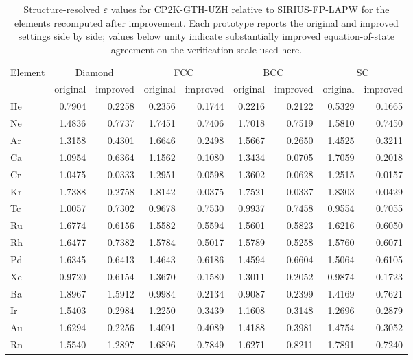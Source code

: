\documentclass[aps,prb,reprint,amsmath,amssymb,superscriptaddress,longbibliography,floatfix]{revtex4-2}
\begin{document}
\begin{table}[htbp]
\centering
\caption{Structure-resolved $\varepsilon$ values for CP2K-GTH-UZH relative to SIRIUS-FP-LAPW for the elements recomputed after improvement. Each prototype reports the original and improved settings side by side; values below unity indicate substantially improved equation-of-state agreement on the verification scale used here.}
\label{tab:epsilon-cp2k-uzh-merged-vs-sirius-fp-lapw}
\begin{tabular}{lrrrrrrrr}
\hline
Element & \multicolumn{2}{c}{Diamond} & \multicolumn{2}{c}{FCC} & \multicolumn{2}{c}{BCC} & \multicolumn{2}{c}{SC} \\
 & original & improved & original & improved & original & improved & original & improved \\
\hline
He & 0.7904 & 0.2258 & 0.2356 & 0.1744 & 0.2216 & 0.2122 & 0.5329 & 0.1665 \\
Ne & 1.4836 & 0.7737 & 1.7451 & 0.7406 & 1.7018 & 0.7519 & 1.5810 & 0.7450 \\
Ar & 1.3158 & 0.4301 & 1.6646 & 0.2498 & 1.5667 & 0.2650 & 1.4525 & 0.3211 \\
Ca & 1.0954 & 0.6364 & 1.1562 & 0.1080 & 1.3434 & 0.0705 & 1.7059 & 0.2018 \\
Cr & 1.0475 & 0.0333 & 1.2951 & 0.0598 & 1.3602 & 0.0628 & 1.2515 & 0.0157 \\
Kr & 1.7388 & 0.2758 & 1.8142 & 0.0375 & 1.7521 & 0.0337 & 1.8303 & 0.0429 \\
Tc & 1.0057 & 0.7302 & 0.9678 & 0.7530 & 0.9937 & 0.7458 & 0.9554 & 0.7055 \\
Ru & 1.6774 & 0.6156 & 1.5582 & 0.5594 & 1.5601 & 0.5823 & 1.6216 & 0.6050 \\
Rh & 1.6477 & 0.7382 & 1.5784 & 0.5017 & 1.5789 & 0.5258 & 1.5760 & 0.6071 \\
Pd & 1.6345 & 0.6413 & 1.4643 & 0.6186 & 1.4594 & 0.6604 & 1.5064 & 0.6105 \\
Xe & 0.9720 & 0.6154 & 1.3670 & 0.1580 & 1.3011 & 0.2052 & 0.9874 & 0.1723 \\
Ba & 1.8967 & 1.5912 & 0.9984 & 0.2134 & 0.9087 & 0.2399 & 1.4169 & 0.7621 \\
Ir & 1.5403 & 0.2984 & 1.2250 & 0.3439 & 1.1608 & 0.3148 & 1.2696 & 0.2879 \\
Au & 1.6294 & 0.2256 & 1.4091 & 0.4089 & 1.4188 & 0.3981 & 1.4754 & 0.3052 \\
Rn & 1.5540 & 1.2897 & 1.6896 & 0.7849 & 1.6271 & 0.8211 & 1.7891 & 0.7240 \\
\hline
\end{tabular}
\end{table}
\end{document}
